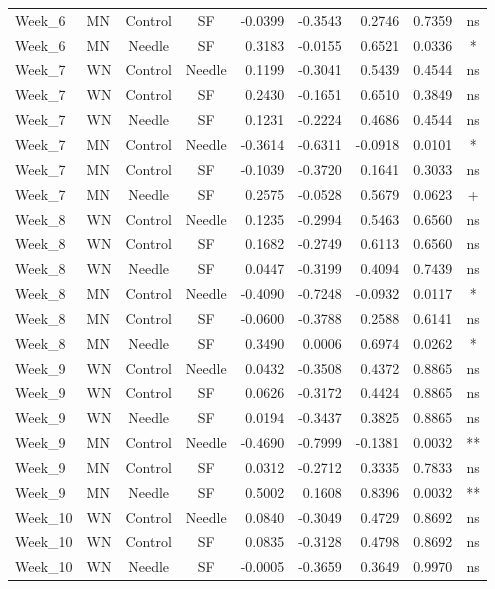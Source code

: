 \documentclass[
  12pt,
  letterpaper,
]{article}
\begin{document}
\begin{longtable}{llccrrrlc}
Week\_6 & MN & Control & SF & -0.0399 & -0.3543 & 0.2746 & 0.7359 & ns \\ 
Week\_6 & MN & Needle & SF & 0.3183 & -0.0155 & 0.6521 & 0.0336 & * \\ 
Week\_7 & WN & Control & Needle & 0.1199 & -0.3041 & 0.5439 & 0.4544 & ns \\ 
Week\_7 & WN & Control & SF & 0.2430 & -0.1651 & 0.6510 & 0.3849 & ns \\ 
Week\_7 & WN & Needle & SF & 0.1231 & -0.2224 & 0.4686 & 0.4544 & ns \\ 
Week\_7 & MN & Control & Needle & -0.3614 & -0.6311 & -0.0918 & 0.0101 & * \\ 
Week\_7 & MN & Control & SF & -0.1039 & -0.3720 & 0.1641 & 0.3033 & ns \\ 
Week\_7 & MN & Needle & SF & 0.2575 & -0.0528 & 0.5679 & 0.0623 & + \\ 
Week\_8 & WN & Control & Needle & 0.1235 & -0.2994 & 0.5463 & 0.6560 & ns \\ 
Week\_8 & WN & Control & SF & 0.1682 & -0.2749 & 0.6113 & 0.6560 & ns \\ 
Week\_8 & WN & Needle & SF & 0.0447 & -0.3199 & 0.4094 & 0.7439 & ns \\ 
Week\_8 & MN & Control & Needle & -0.4090 & -0.7248 & -0.0932 & 0.0117 & * \\ 
Week\_8 & MN & Control & SF & -0.0600 & -0.3788 & 0.2588 & 0.6141 & ns \\ 
Week\_8 & MN & Needle & SF & 0.3490 & 0.0006 & 0.6974 & 0.0262 & * \\ 
Week\_9 & WN & Control & Needle & 0.0432 & -0.3508 & 0.4372 & 0.8865 & ns \\ 
Week\_9 & WN & Control & SF & 0.0626 & -0.3172 & 0.4424 & 0.8865 & ns \\ 
Week\_9 & WN & Needle & SF & 0.0194 & -0.3437 & 0.3825 & 0.8865 & ns \\ 
Week\_9 & MN & Control & Needle & -0.4690 & -0.7999 & -0.1381 & 0.0032 & ** \\ 
Week\_9 & MN & Control & SF & 0.0312 & -0.2712 & 0.3335 & 0.7833 & ns \\ 
Week\_9 & MN & Needle & SF & 0.5002 & 0.1608 & 0.8396 & 0.0032 & ** \\ 
Week\_10 & WN & Control & Needle & 0.0840 & -0.3049 & 0.4729 & 0.8692 & ns \\ 
Week\_10 & WN & Control & SF & 0.0835 & -0.3128 & 0.4798 & 0.8692 & ns \\ 
Week\_10 & WN & Needle & SF & -0.0005 & -0.3659 & 0.3649 & 0.9970 & ns \\ 

\end{longtable}
\end{document}
